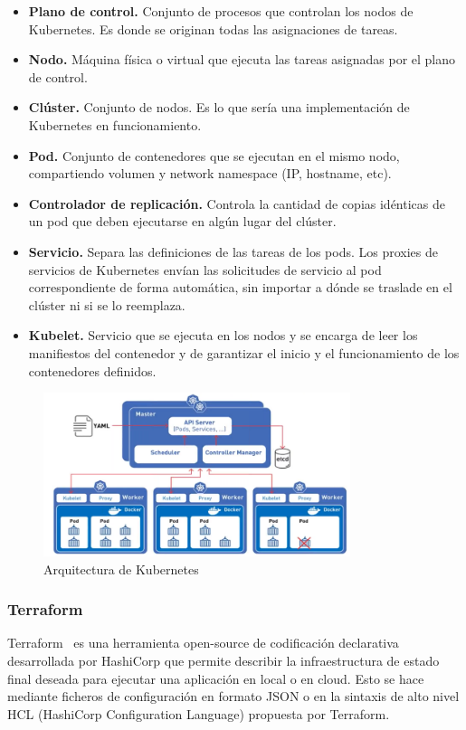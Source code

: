 	\begin{itemize}
		\item \textbf{Plano de control.} Conjunto de procesos que controlan los nodos de Kubernetes. Es donde se originan todas las asignaciones de tareas.
		\item \textbf{Nodo.} Máquina física o virtual que ejecuta las tareas asignadas por el plano de control.
		\item \textbf{Clúster.} Conjunto de nodos. Es lo que sería una implementación de Kubernetes en funcionamiento.
		\item \textbf{Pod.} Conjunto de contenedores que se ejecutan en el mismo nodo, compartiendo volumen y network namespace (IP, hostname, etc).
		\item \textbf{Controlador de replicación.} Controla la cantidad de copias idénticas de un pod que deben ejecutarse en algún lugar del clúster.
		\item \textbf{Servicio.} Separa las definiciones de las tareas de los pods. Los proxies de servicios de Kubernetes envían las solicitudes de servicio al pod correspondiente de forma automática, sin importar a dónde se traslade en el clúster ni si se lo reemplaza.
		\item \textbf{Kubelet.} Servicio que se ejecuta en los nodos y se encarga de leer los manifiestos del contenedor y de garantizar el inicio y el funcionamiento de los contenedores definidos.
	\end{itemize}

	\begin{figure}[h]
	\centering
	\includegraphics[width=0.8\textwidth]{../imgs/EdA/k8s-arch.png}
	\caption{Arquitectura de Kubernetes}
	\label{fig:k8s}
	\end{figure}

\subsubsection{Terraform}
	Terraform~\cite{orq4} es una herramienta open-source de codificación declarativa desarrollada por HashiCorp que permite describir la infraestructura de estado final deseada para ejecutar una aplicación en local o en cloud. Esto se hace mediante ficheros de configuración en formato JSON o en la sintaxis de alto nivel HCL (HashiCorp Configuration Language) propuesta por Terraform. 

